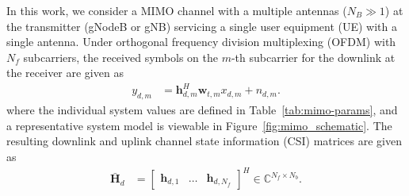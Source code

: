 In this work, we consider a MIMO channel with a multiple antennas ($N_B \gg 1$) at the transmitter (gNodeB or gNB) servicing a single user equipment (UE) with a single antenna. Under orthogonal frequency division multiplexing (OFDM) with $N_f$ subcarriers, the received symbols on the $m$-th subcarrier for the downlink at the receiver are given as
\begin{align*}
	y_{d,m} &= \mathbf h_{d,m}^H\mathbf w_{t,m}x_{d,m} + n_{d,m}.
\end{align*}
where the individual system values are defined in Table~\ref{tab:mimo-params}, and a representative system model is viewable in Figure~\ref{fig:mimo_schematic}. The resulting downlink and uplink channel state information (CSI) matrices are given as
\begin{align*} 
	\bar{\mathbf H}_d &= \begin{bmatrix} \mathbf h_{d,1} & \dots & \mathbf h_{d,N_f}\end{bmatrix}^H \in \mathbb C^{N_f \times N_b}.
\end{align*}
